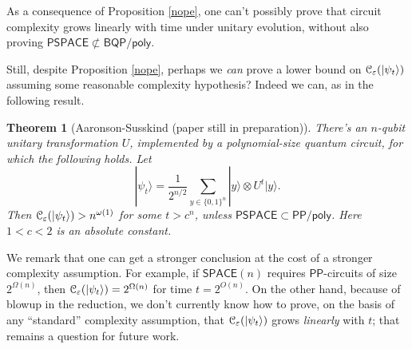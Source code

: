 \documentclass[11pt]{report}
\theoremstyle{plain}
\newtheorem{theorem}{Theorem}[section]
\theoremstyle{definition}
\newcommand{\eps}{\varepsilon}
\renewcommand{\ket}[1]{|#1\rangle}
\begin{document}
As a consequence of Proposition \ref{nope}, one can't possibly prove that circuit complexity grows linearly with time under unitary evolution, without also proving $\mathsf{PSPACE} \not\subset \mathsf{BQP/poly}$.

Still, despite Proposition \ref{nope}, perhaps we {\em can} prove a lower bound on ${\cal C}_\eps(\ket{\psi_t})$ assuming some reasonable complexity hypothesis? Indeed we can, as in the following result.

\begin{theorem}[Aaronson-Susskind (paper still in preparation)]
\label{thm:asusskind}
There's an $n$-qubit unitary transformation $U$, implemented by a polynomial-size quantum circuit, for which the following holds.  Let
\[
\ket{\psi_t} = \frac{1}{2^{n/2}} \sum_{y \in \{0,1\}^n} \ket{y} \otimes U^t \ket{y}.
\]
Then ${\cal C}_\eps(\ket{\psi_t}) > n^{\omega(1)}$ for some $t > c^n$, unless $\mathsf{PSPACE} \subset \mathsf{PP/poly}$.  Here $1<c<2$ is an absolute constant.
\end{theorem}

We remark that one can get a stronger conclusion at the cost of a stronger complexity assumption.  For example, if $\mathsf{SPACE}(n)$ requires $\mathsf{PP}$-circuits of size $2^{\Omega(n)}$, then ${\cal C}_\eps(\ket{\psi_t}) = 2^{\Omega(n)}$ for time $t=2^{O(n)}$.  On the other hand, because of blowup in the reduction, we don't currently know how to prove, on the basis of any ``standard'' complexity assumption, that ${\cal C}_\eps(\ket{\psi_t})$ grows {\em linearly} with $t$; that remains a question for future work.
\end{document}
